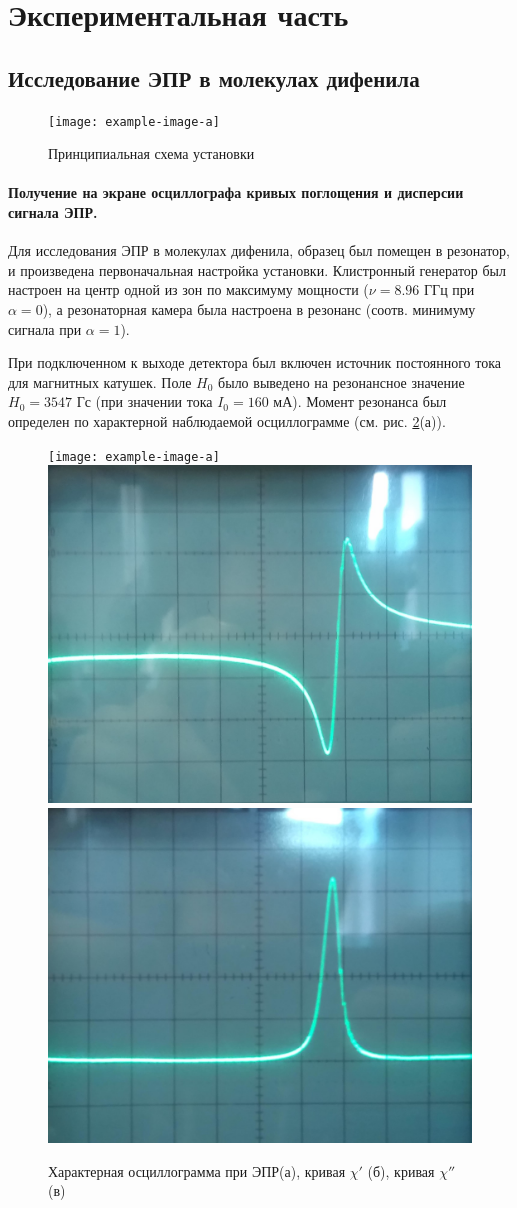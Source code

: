 \section{Экспериментальная часть}%


\subsection{Исследование ЭПР в молекулах дифенила}%
\begin{figure}[h!]
    \centering
    \texttt{[image: example-image-a]}
    \caption{Принципиальная схема установки}
    \label{fig:1}
\end{figure}
\paragraph{Получение на экране осциллографа кривых поглощения и дисперсии сигнала ЭПР.}%
\label{par:1}
Для исследования ЭПР в молекулах дифенила, образец был помещен в резонатор, и произведена первоначальная настройка
установки. Клистронный генератор был настроен на центр одной из зон по максимуму мощности ($\nu = 8.96$ ГГц при $\alpha = 0$), а
резонаторная камера была настроена в резонанс (соотв. минимуму сигнала при $\alpha = 1$).

При подключенном к выходе детектора был включен источник постоянного тока для магнитных катушек. Поле $H_0$ было выведено на
резонансное значение $H_0 = 3547$ Гс (при значении тока $I_0 = 160$ мА). Момент резонанса был определен по характерной
наблюдаемой осциллограмме (см. рис. \ref{fig:2}(а)).
\begin{figure}[h!]
    \centering
    \texttt{[image: example-image-a]}
    \includegraphics[width=0.3\linewidth]{fig/fig2}
    \includegraphics[width=0.3\linewidth]{fig/fig3}
    \caption{Характерная осциллограмма при ЭПР(а), кривая $\chi'$ (б), кривая $\chi''$ (в)}
    \label{fig:2}
\end{figure}

